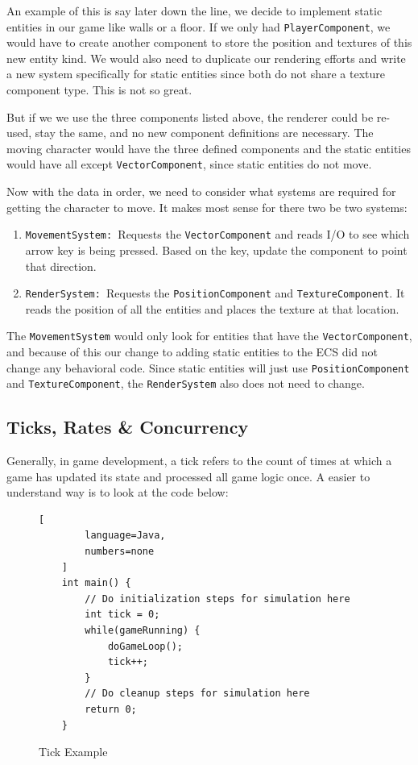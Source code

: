 An example of this is say later down the line, we decide to implement static entities in our game like walls or a floor. If we only had \texttt{PlayerComponent}, we would have to create another component to store the position and textures of this new entity kind. We would also need to duplicate our rendering efforts and write a new system specifically for static entities since both do not share a texture component type. This is not so great. 

But if we we use the three components listed above, the renderer could be re-used, stay the same, and no new component definitions are necessary. The moving character would have the three defined components and the static entities would have all except \texttt{VectorComponent}, since static entities do not move.

Now with the data in order, we need to consider what systems are required for getting the character to move. It makes most sense for there two be two systems:

\begin{enumerate}
    \item \texttt{MovementSystem: }Requests the \texttt{VectorComponent} and reads I/O to see which arrow key is being pressed. Based on the key, update the component to point that direction.
    \item \texttt{RenderSystem: }Requests the \texttt{PositionComponent} and \texttt{TextureComponent}. It reads the position of all the entities and places the texture at that location. 
\end{enumerate}

The \texttt{MovementSystem} would only look for entities that have the \texttt{VectorComponent}, and because of this our change to adding static entities to the ECS did not change any behavioral code. Since static entities will just use \texttt{PositionComponent} and \texttt{TextureComponent}, the \texttt{RenderSystem} also does not need to change.

\subsection{Ticks, Rates \& Concurrency}
Generally, in game development, a tick refers to the count of times at which a game has updated its state and processed all game logic once. A easier to understand way is to look at the code below: 

\begin{figure}[H]
    \begin{lstlisting}[
        language=Java,
        numbers=none
    ]
    int main() {
        // Do initialization steps for simulation here
        int tick = 0;
        while(gameRunning) {
            doGameLoop();
            tick++;
        }
        // Do cleanup steps for simulation here
        return 0;
    }
\end{lstlisting}
    \caption{Tick Example}
    \label{code:naive_ecs_data}
\end{figure}

